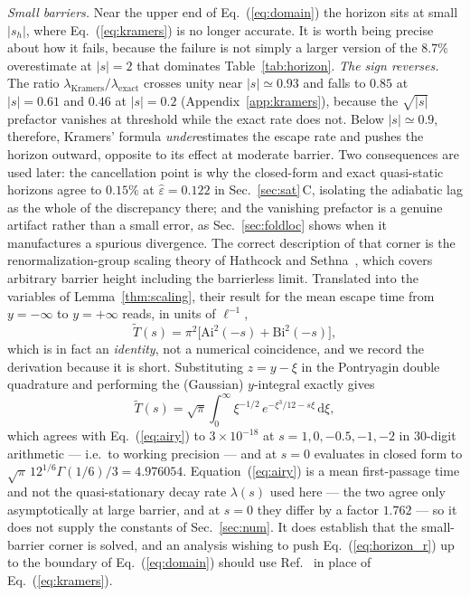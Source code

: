 \documentclass[%
 aip,
 cha,
 amsmath,amssymb,
 reprint,
 superscriptaddress,
 floatfix,
]{revtex4-2}
\newcommand{\dd}{\mathrm{d}}
\newcommand{\Sig}{\hat\varepsilon}
\begin{document}
\emph{Small barriers.}  Near the upper end of Eq.~(\ref{eq:domain}) the horizon sits at small $|s_h|$, where Eq.~(\ref{eq:kramers}) is no longer accurate.  It is worth being precise about how it fails, because the failure is not simply a larger version of the $8.7\%$ overestimate at $|s|=2$ that dominates Table~\ref{tab:horizon}.  \emph{The sign reverses.}  The ratio $\lambda_{\mathrm{Kramers}}/\lambda_{\mathrm{exact}}$ crosses unity near $|s|\simeq0.93$ and falls to $0.85$ at $|s|=0.61$ and $0.46$ at $|s|=0.2$ (Appendix~\ref{app:kramers}), because the $\sqrt{|s|}$ prefactor vanishes at threshold while the exact rate does not.  Below $|s|\simeq0.9$, therefore, Kramers' formula \emph{under}estimates the escape rate and pushes the horizon outward, opposite to its effect at moderate barrier.  Two consequences are used later: the cancellation point is why the closed-form and exact quasi-static horizons agree to $0.15\%$ at $\Sig=0.122$ in Sec.~\ref{sec:sat}\,C, isolating the adiabatic lag as the whole of the discrepancy there; and the vanishing prefactor is a genuine artifact rather than a small error, as Sec.~\ref{sec:foldloc} shows when it manufactures a spurious divergence.  The correct description of that corner is the renormalization-group scaling theory of Hathcock and Sethna~\cite{HathcockSethna2021}, which covers arbitrary barrier height including the barrierless limit.  Translated into the variables of Lemma~\ref{thm:scaling}, their result for the mean escape time from $y=-\infty$ to $y=+\infty$ reads, in units of $\ell^{-1}$,
\begin{equation}
\label{eq:airy}
\tilde T(s)=\pi^2\bigl[\mathrm{Ai}^2(-s)+\mathrm{Bi}^2(-s)\bigr],
\end{equation}
which is in fact an \emph{identity}, not a numerical coincidence, and we record the derivation because it is short.  Substituting $z=y-\xi$ in the Pontryagin double quadrature and performing the (Gaussian) $y$-integral exactly gives
\begin{equation}
\label{eq:airyid}
\tilde T(s)=\sqrt\pi\int_0^\infty\xi^{-1/2}\,e^{-\xi^3/12-s\xi}\,\dd\xi ,
\end{equation}
which agrees with Eq.~(\ref{eq:airy}) to $3\times10^{-18}$ at $s=1,0,-0.5,-1,-2$ in $30$-digit arithmetic --- i.e.\ to working precision --- and at $s=0$ evaluates in closed form to $\sqrt\pi\,12^{1/6}\Gamma(1/6)/3=4.976054$.  Equation~(\ref{eq:airy}) is a mean first-passage time and not the quasi-stationary decay rate $\lambda(s)$ used here --- the two agree only asymptotically at large barrier, and at $s=0$ they differ by a factor $1.762$ --- so it does not supply the constants of Sec.~\ref{sec:num}.  It does establish that the small-barrier corner is solved, and an analysis wishing to push Eq.~(\ref{eq:horizon_r}) up to the boundary of Eq.~(\ref{eq:domain}) should use Ref.~\cite{HathcockSethna2021} in place of Eq.~(\ref{eq:kramers}).
\end{document}
